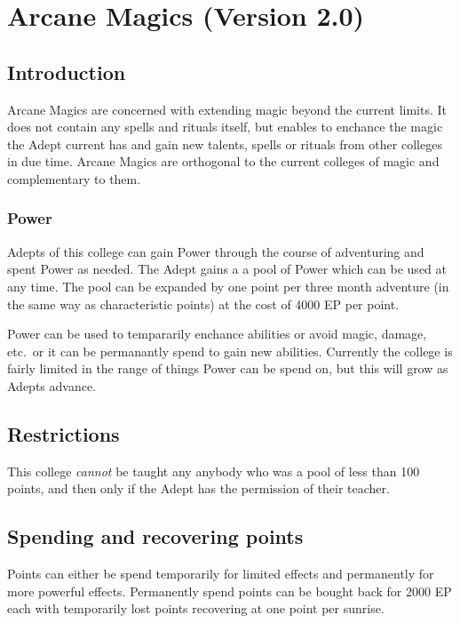 \documentclass[a4paper]{article}
\begin{document}
\section{Arcane Magics (Version 2.0)}
\begin{multicols}{2}

\subsection{Introduction}

Arcane Magics are concerned with extending magic beyond the current
limits.  It does not contain any spells and rituals itself, but
enables to enchance the magic the Adept current has and gain new
talents, spells or rituals from other colleges in due time.  Arcane
Magics are orthogonal to the current colleges of magic and
complementary to them.

\subsubsection{Power}

Adepts of this college can gain Power through the course of
adventuring and spent Power as needed.  The Adept gains a a pool of
Power which can be used at any time.  The pool can be expanded by one
point per three month adventure (in the same way as characteristic
points) at the cost of 4000 EP per point.

Power can be used to tempararily enchance abilities or avoid magic,
damage, etc.\ or it can be permanantly spend to gain new abilities.
Currently the college is fairly limited in the range of things Power
can be spend on, but this will grow as Adepts advance.

\subsection{Restrictions}

This college \emph{cannot} be taught any anybody who was a pool of
less than 100 points, and then only if the Adept has the permission of
their teacher.

\subsection{Spending and recovering points}

Points can either be spend temporarily for limited effects and
permanently for more powerful effects.  Permanently spend points
can be bought back for 2000 EP each with temporarily lost points
recovering at one point per sunrise.


\end{multicols}
\end{document}
